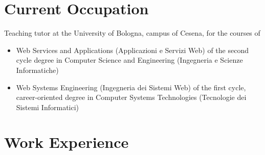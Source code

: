 \documentclass[a4paper,10pt]{article}
\begin{document}
\pagestyle{style1}




\section{Current Occupation}

Teaching tutor at the University of Bologna, campus of Cesena, for the courses of
\begin{itemize}
  \item Web Services and Applications (Applicazioni e Servizi Web) of the second cycle degree in Computer Science and Engineering (Ingegneria e Scienze Informatiche)
  \item Web Systems Engineering (Ingegneria dei Sistemi Web) of the first cycle, career-oriented degree in Computer Systems Technologies (Tecnologie dei Sistemi Informatici)
\end{itemize}

\vspace{20pt}


\section{Work Experience}
\end{document}
